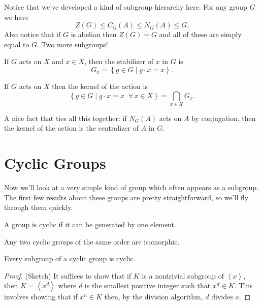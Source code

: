 \documentclass[../m171main.tex]{subfiles}
\begin{document}
Notice that we've developed a kind of subgroup hierarchy here.
For any group $G$ we have
\[ Z(G) \leq C_G(A) \leq N_G(A) \leq G. \]
Also notice that if $G$ is abelian then $Z(G) = G$ and all of these are simply equal to $G$.
Two more subgroups!

\begin{definition}[Stabilizer]
    If $G$ acts on $X$ and $x \in X$, then the stabilizer of $x$ in $G$ is
    \[ G_x = \left\{ g \in G \;|\; g \cdot x = x \right\}. \]
\end{definition}

\begin{definition}[Kernel]
    If $G$ acts on $X$ then the kernel of the action is
    \[ \left\{ g \in G \;|\; g \cdot x = x \;\;\forall\, x \in X \right\} = \bigcap_{x \in X} G_x. \]
\end{definition}

A nice fact that ties all this together: if $N_G(A)$ acts on $A$ by conjugation, then the kernel of the action is the centralizer of $A$ in $G$.

\section{Cyclic Groups}
Now we'll look at a very simple kind of group which often appears as a subgroup.
The first few results about these groups are pretty straightforward, so we'll fly through them quickly.

\begin{definition}
    A group is cyclic if it can be generated by one element.
\end{definition}

\begin{theorem}[]
    Any two cyclic groups of the same order are isomorphic.
\end{theorem}

\begin{theorem}
    Every subgroup of a cyclic group is cyclic.
\end{theorem}

\begin{proof}
    (Sketch) It suffices to show that if $K$ is a nontrivial subgroup of $\left< x \right>$, then $K = \left< x^{d} \right>$ where $d$ is the smallest positive integer such that $x^{d} \in K$.
    This involves showing that if $x^{n} \in K$ then, by the division algorithm, $d$ divides $a$.
\end{proof}
\end{document}
